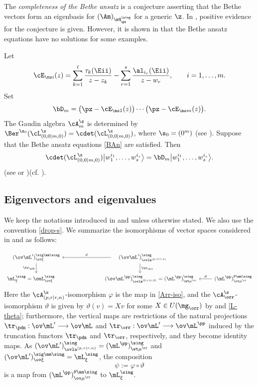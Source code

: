 \documentclass[11pt, reqno]{amsart}
\theoremstyle{definition}
\theoremstyle{remark}
\numberwithin{equation}{section}
\begin{document}
The \emph{completeness of the Bethe ansatz} is a conjecture asserting that the Bethe vectors form an eigenbasis for $(\Am)_{\mV^\sing_{\! \ga}}$ for a generic $\z$.
In \cite{MV05}, positive evidence for the conjecture is given.
However, it is shown in \cite{MV07} that the Bethe ansatz equations have no solutions for some examples.

Let
$$
\cE_{\ns i}(z)=\sum_{k=1}^\ell \frac{\tau_k (\Eii)}{z-z_k}-\sum_{r=1}^s \frac{\al_{i_r}(\Eii)}{z-w_r}, \qquad i=1, \ldots, m.
$$
Set
$$
\bD_m=\big(\pz-\cE_{\ns 1}(z) \big) \cdots \big(\pz-\cE_{\ns m}(z) \big).
$$
The Gaudin algebra $\cA_{m}^\z$ is determined by $\Ber^{\s_0}(\cL^\z_{(0,0|m,0)})=\cdet(\cL^\z_{(0,0|m,0)})$, where $\s_0=(0^m)$ (see ).
Suppose that the Bethe ansatz equations \eqref{BAn} are satisfied. Then
$$
\cdet(\cL^\z_{(0,0|m,0)}) \big|w_1^{i_1},\ldots,w_s^{i_s} \big\rangle=\bD_m  \big|w_1^{i_1},\ldots,w_s^{i_s} \big\rangle.
$$
(see \cite[Theorem 9.2]{MTV06} or \cite[Theorem 3.2]{MM17})(cf. \cite[Theorem 3]{FFR}).



\subsection{Eigenvectors and eigenvalues} \label{eig}

We keep the notations introduced in  and  unless otherwise stated.
We also use the convention \eqref{drop-s}.
We summarize the isomorphisms of vector spaces considered in  and  as follows:

\begin{equation}\label{diagram}
\begin{tikzcd}
(\ov\mL^\prime)_{\ov\xi}^{\sig\mm\sing} \arrow[d,swap, "\tr_\pdn"]
&\quad (\ov\mL^\prime)_{\ovla^{(p, r|r, n)}}^\sing\arrow[l,swap,"\varphi"]  \arrow[d,"\tr_\orr"]     &\\
\mL^\sing_{\xi}=\omL^\sing_{\ov\xi}\qquad&\qquad \qquad (\ov\mL^\pp)_{\ovla^{(0, r|r, 0)}}^\sing=(\mL^\pp)_{\wt\mu^\rr}^\sing& (\mL^\pp)^{\theta\mm\sing}_{\ov\mu^\rr}\arrow[l,swap,"\vartheta"]
\end{tikzcd}
\end{equation}
Here the $\cA^\z_{(p, r|r,n)}$-isomorphism $\varphi$ is the map in \eqref{Arr-iso},
and the $\cA_\orr^\z$-isomorphism $\vartheta$ is given by $\vartheta(v)=X v$ for some $X \in U(\mg_\orr)$ by  and \eqref{L-theta}; 
furthermore, the vertical maps are restrictions of the natural projections $\tr_\pdn: \ov\mL^\prime \longrightarrow \ov\mL$ and $\tr_\orr: \ov\mL^\prime \longrightarrow \ov\mL^\pp$ induced by the truncation functors $\tr_\pdn$ and $\tr_\orr$, respectively, and they become identity maps.
%
As $(\ov\mL^\prime)_{\ovla^{(p, r|r, n)}}^\sing=(\mL^\pp)^{\sing}_{\wt\mu^\rr}$ and $(\ov\mL^\prime)_{\ov\xi}^{\sig\mm\sing}=\mL^\sing_{\xi}$,
the composition
$$
\psi:=\varphi \circ \vartheta
$$
is a map from $(\mL^\pp)^{\theta\mm\sing}_{\ov\mu^\rr}$ to $\mL^\sing_{\xi}$.
\end{document}
